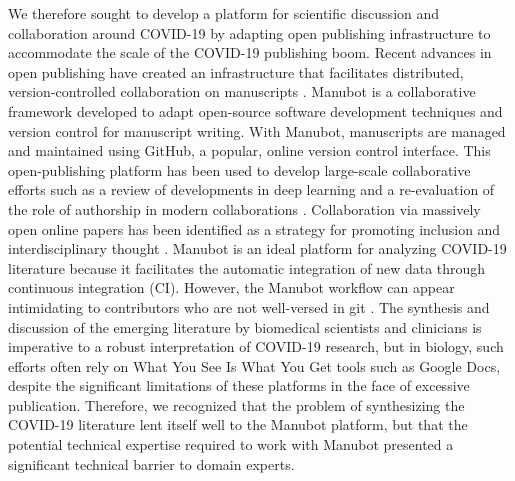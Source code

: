 \documentclass[sigconf]{acmart}
\begin{document}
We therefore sought to develop a platform for scientific discussion and collaboration around COVID-19 by adapting open publishing infrastructure to accommodate the scale of the COVID-19 publishing boom.
Recent advances in open publishing have created an infrastructure that facilitates distributed, version-controlled collaboration on manuscripts \citep{YuJbg3zO}.
Manubot \citep{YuJbg3zO} is a collaborative framework developed to adapt open-source software development techniques and version control for manuscript writing.
With Manubot, manuscripts are managed and maintained using GitHub, a popular, online version control interface.
This open-publishing platform has been used to develop large-scale collaborative efforts such as a review of developments in deep learning \citep{PZMP42Ak} and a re-evaluation of the role of authorship in modern collaborations \citep{6acsZuy7}.
Collaboration via massively open online papers has been identified as a strategy for promoting inclusion and interdisciplinary thought \citep{PoDz2q0A}.
Manubot is an ideal platform for analyzing COVID-19 literature because it facilitates the automatic integration of new data through continuous integration (CI).
However, the Manubot workflow can appear intimidating to contributors who are not well-versed in git \citep{PoDz2q0A}.
The synthesis and discussion of the emerging literature by biomedical scientists and clinicians is imperative to a robust interpretation of COVID-19 research, but in biology, such efforts often rely on What You See Is What You Get tools such as Google Docs, despite the significant limitations of these platforms in the face of excessive publication.
Therefore, we recognized that the problem of synthesizing the COVID-19 literature lent itself well to the Manubot platform, but that the potential technical expertise required to work with Manubot presented a significant technical barrier to domain experts.
\end{document}
